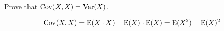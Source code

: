 \question Prove that $\text{Cov}(X, X) = \text{Var}(X)$.
\begin{solution}[.75cm]
	\[\text{Cov}(X, X) = \text{E} (X \cdot X) - \text{E} (X) \cdot \text{E}(X) = \text{E}(X^2) - \text{E}(X)^2\]
\end{solution}